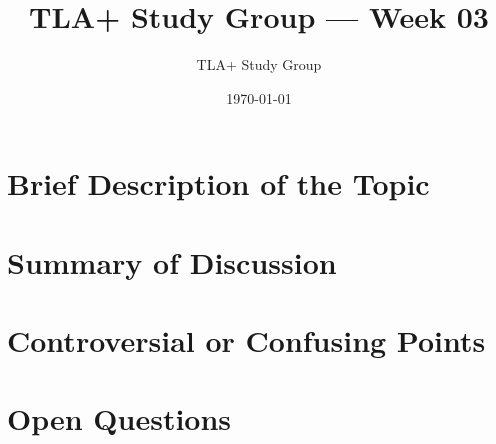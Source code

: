 \documentclass[11pt]{article}
\title{TLA+ Study Group — Week 03}
\author{TLA+ Study Group}
\date{\today}
\begin{document}
\maketitle

\section*{Brief Description of the Topic}

\section*{Summary of Discussion}

\section*{Controversial or Confusing Points}

\section*{Open Questions}
\end{document}
